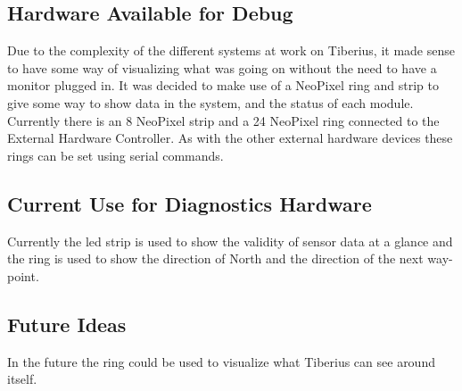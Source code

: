 \label{diagnostics}
\subsection{Hardware Available for Debug}
Due to the complexity of the different systems at work on Tiberius, it made sense to have some way of visualizing what was going on without the need to have a monitor plugged in.
\newline
It was decided to make use of a NeoPixel ring and strip to give some way to show data in the system, and the status of each module.
\newline
Currently there is an 8 NeoPixel strip and a 24 NeoPixel ring connected to the External Hardware Controller. As with the other external hardware devices these rings can be set using serial commands.

\subsection{Current Use for Diagnostics Hardware}
Currently the led strip is used to show the validity of sensor data at a glance and the ring is used to show the direction of North and the direction of the next way-point.
\subsection{Future Ideas}
In the future the ring could be used to visualize what Tiberius can see around itself.
\pagestyle{euan}













